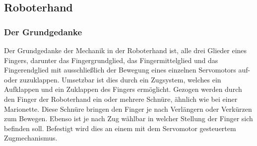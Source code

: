 \documentclass[titlepage,12pt,twoside]{article}
\begin{document}
\newpage
\subsection{Roboterhand}
\subsubsection{Der Grundgedanke}
Der Grundgedanke der Mechanik in der Roboterhand ist, alle drei Glieder eines Fingers,
darunter das Fingergrundglied, das Fingermittelglied und das Fingerendglied mit 
ausschließlich der Bewegung eines einzelnen Servomotors auf- oder zuzuklappen. 
Umsetzbar ist dies durch ein Zugsystem, welches ein Aufklappen und ein Zuklappen 
des Fingers ermöglicht. Gezogen werden durch den Finger der Roboterhand ein oder mehrere 
Schnüre, ähnlich wie bei einer Marionette. Diese Schnüre bringen den Finger je nach 
Verlängern oder Verkürzen zum Bewegen. Ebenso ist je nach Zug wählbar in welcher 
Stellung der Finger sich befinden soll. Befestigt wird dies an einem mit dem Servomotor 
gesteuertem Zugmechanismus. \\
\end{document}
